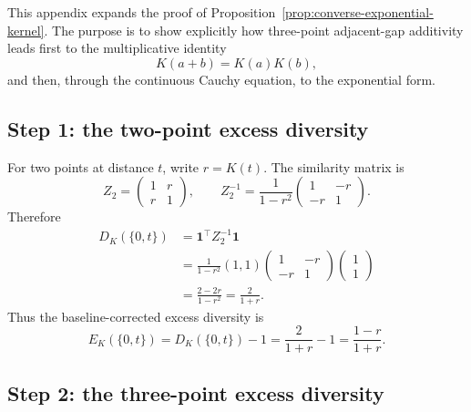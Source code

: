 \documentclass[12pt,a4paper]{article}
\begin{document}
This appendix expands the proof of Proposition~\ref{prop:converse-exponential-kernel}.  The purpose is to show explicitly how three-point adjacent-gap additivity leads first to the multiplicative identity
\[
  K(a+b)=K(a)K(b),
\]
and then, through the continuous Cauchy equation, to the exponential form.

\subsection*{Step 1: the two-point excess diversity}

For two points at distance $t$, write $r=K(t)$.  The similarity matrix is
\[
  Z_2=
  \begin{pmatrix}
  1&r\\ r&1
  \end{pmatrix},
  \qquad
  Z_2^{-1}=\frac{1}{1-r^2}
  \begin{pmatrix}
  1&-r\\ -r&1
  \end{pmatrix}.
\]
Therefore
\[
\begin{aligned}
  D_K(\{0,t\})
  &=\mathbf{1}^\top Z_2^{-1}\mathbf{1} \\
  &=\frac{1}{1-r^2}(1,1)
    \begin{pmatrix}
    1&-r\\ -r&1
    \end{pmatrix}
    \begin{pmatrix}1\\1\end{pmatrix} \\
  &=\frac{2-2r}{1-r^2}
   =\frac{2}{1+r}.
\end{aligned}
\]
Thus the baseline-corrected excess diversity is
\[
  E_K(\{0,t\})
  =D_K(\{0,t\})-1
  =\frac{2}{1+r}-1
  =\frac{1-r}{1+r}.
\]

\subsection*{Step 2: the three-point excess diversity}
\end{document}
